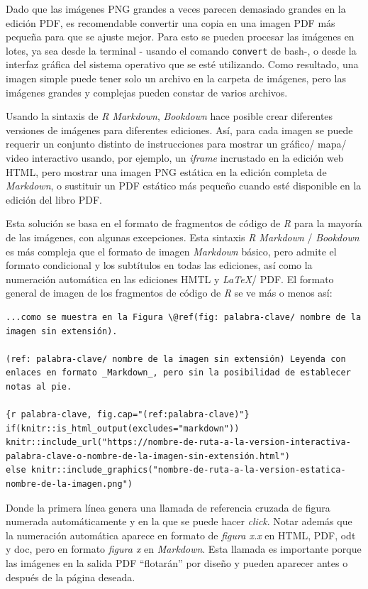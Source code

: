 \documentclass[
]{book}
\begin{document}
Dado que las imágenes PNG grandes a veces parecen demasiado grandes en la edición PDF, es recomendable convertir una copia en una imagen PDF más pequeña para que se ajuste mejor. Para esto se pueden procesar las imágenes en lotes, ya sea desde la terminal - usando el comando \texttt{convert} de bash-, o desde la interfaz gráfica del sistema operativo que se esté utilizando. Como resultado, una imagen simple puede tener solo un archivo en la carpeta de imágenes, pero las imágenes grandes y complejas pueden constar de varios archivos.

Usando la sintaxis de \emph{R Markdown}, \emph{Bookdown} hace posible crear diferentes versiones de imágenes para diferentes ediciones. Así, para cada imagen se puede requerir un conjunto distinto de instrucciones para mostrar un gráfico/ mapa/ video interactivo usando, por ejemplo, un \emph{iframe} incrustado en la edición web HTML, pero mostrar una imagen PNG estática en la edición completa de \emph{Markdown}, o sustituir un PDF estático más pequeño cuando esté disponible en la edición del libro PDF.

Esta solución se basa en el formato de fragmentos de código de \emph{R} para la mayoría de las imágenes, con algunas excepciones. Esta sintaxis \emph{R Markdown} / \emph{Bookdown} es más compleja que el formato de imagen \emph{Markdown} básico, pero admite el formato condicional y los subtítulos en todas las ediciones, así como la numeración automática en las ediciones HMTL y \emph{LaTeX}/ PDF. El formato general de imagen de los fragmentos de código de \emph{R} se ve más o menos así:

\begin{verbatim}
...como se muestra en la Figura \@ref(fig: palabra-clave/ nombre de la imagen sin extensión).

(ref: palabra-clave/ nombre de la imagen sin extensión) Leyenda con enlaces en formato _Markdown_, pero sin la posibilidad de establecer notas al pie.

{r palabra-clave, fig.cap="(ref:palabra-clave)"}
if(knitr::is_html_output(excludes="markdown")) knitr::include_url("https://nombre-de-ruta-a-la-version-interactiva-palabra-clave-o-nombre-de-la-imagen-sin-extensión.html")
else knitr::include_graphics("nombre-de-ruta-a-la-version-estatica-nombre-de-la-imagen.png")
\end{verbatim}

Donde la primera línea genera una llamada de referencia cruzada de figura numerada automáticamente y en la que se puede hacer \emph{click}. Notar además que la numeración automática aparece en formato de \emph{figura x.x} en HTML, PDF, odt y doc, pero en formato \emph{figura x} en \emph{Markdown}. Esta llamada es importante porque las imágenes en la salida PDF ``flotarán'' por diseño y pueden aparecer antes o después de la página deseada.
\end{document}
